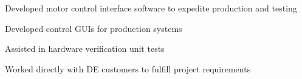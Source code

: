 \documentclass[]{deedy-resume-andrewvanhorn}
\begin{document}
\begin{minipage}[t]{0.66\textwidth} 

\sectionsep
\sectionsep
\section{}

\vspace{\topsep} %
\begin{tightemize}
	\item Developed motor control interface software to expedite production and testing
	\item Developed control GUIs for production systems
	\item Assisted in hardware verification unit tests
	\item Worked directly with DE customers to fulfill project requirements
\end{tightemize}
\sectionsep


\end{minipage}
\end{document}

